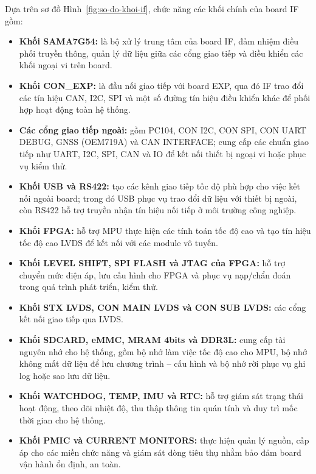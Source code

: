Dựa trên sơ đồ Hình~\ref{fig:so-do-khoi-if}, chức năng các khối chính của board IF gồm:
\begin{itemize}
    \item \textbf{Khối SAMA7G54:} là bộ xử lý trung tâm của board IF, đảm nhiệm điều phối truyền thông, quản lý dữ liệu giữa các cổng giao tiếp và điều khiển các khối ngoại vi trên board.

    \item \textbf{Khối CON\_EXP:} là đầu nối giao tiếp với board EXP, qua đó IF trao đổi các tín hiệu CAN, I2C, SPI và một số đường tín hiệu điều khiển khác để phối hợp hoạt động toàn hệ thống.

    \item \textbf{Các cổng giao tiếp ngoài:} gồm PC104, CON I2C, CON SPI, CON UART DEBUG, GNSS (OEM719A) và CAN INTERFACE; cung cấp các chuẩn giao tiếp như UART, I2C, SPI, CAN và IO để kết nối thiết bị ngoại vi hoặc phục vụ kiểm thử.

    \item \textbf{Khối USB và RS422:} tạo các kênh giao tiếp tốc độ phù hợp cho việc kết nối ngoài board; trong đó USB phục vụ trao đổi dữ liệu với thiết bị ngoài, còn RS422 hỗ trợ truyền nhận tín hiệu nối tiếp ở môi trường công nghiệp.

    \item \textbf{Khối FPGA:} hỗ trợ MPU thực hiện các tính toán tốc độ cao và tạo tín hiệu tốc độ cao LVDS để kết nối với các module vô tuyến.

    \item \textbf{Khối LEVEL SHIFT, SPI FLASH và JTAG của FPGA:} hỗ trợ chuyển mức điện áp, lưu cấu hình cho FPGA và phục vụ nạp/chẩn đoán trong quá trình phát triển, kiểm thử.

    \item \textbf{Khối STX LVDS, CON MAIN LVDS và CON SUB LVDS:} các cổng kết nối giao tiếp qua LVDS.

    \item \textbf{Khối SDCARD, eMMC, MRAM 4bits và DDR3L:} cung cấp tài nguyên nhớ cho hệ thống, gồm bộ nhớ làm việc tốc độ cao cho MPU, bộ nhớ không mất dữ liệu để lưu chương trình -- cấu hình và bộ nhớ rời phục vụ ghi log hoặc sao lưu dữ liệu.

    \item \textbf{Khối WATCHDOG, TEMP, IMU và RTC:} hỗ trợ giám sát trạng thái hoạt động, theo dõi nhiệt độ, thu thập thông tin quán tính và duy trì mốc thời gian cho hệ thống.

    \item \textbf{Khối PMIC và CURRENT MONITORS:} thực hiện quản lý nguồn, cấp áp cho các miền chức năng và giám sát dòng tiêu thụ nhằm bảo đảm board vận hành ổn định, an toàn.
\end{itemize}



